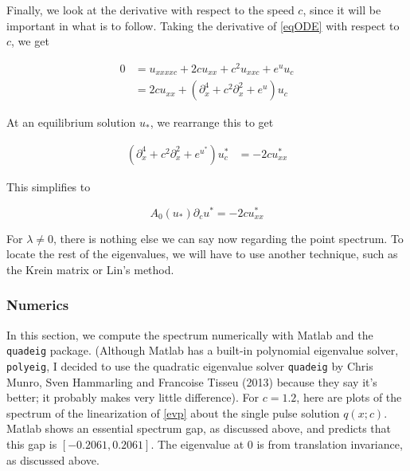 \documentclass[12pt]{article}
\begin{document}
Finally, we look at the derivative with respect to the speed $c$, since it will be important in what is to follow. Taking the derivative of \eqref{eqODE} with respect to $c$, we get

\begin{align*}
0 &= u_{xxxxc} + 2 c u_{xx} + c^2 u_{xxc} + e^{u} u_c \\
&= 2 c u_{xx} + (\partial_x^4 + c^2 \partial_x^2 + e^{u})u_c
\end{align*}

At an equilibrium solution $u_*$, we rearrange this to get

\begin{align*}
(\partial_x^4 + c^2 \partial_x^2 + e^{u^*})u^*_c &= -2 c u^*_{xx}
\end{align*}

This simplifies to 

\begin{equation}\label{uc}
A_0(u_*) \partial_c u^* = -2 c u^*_{xx}
\end{equation}

For $\lambda \neq 0$, there is nothing else we can say now regarding the point spectrum. To locate the rest of the eigenvalues, we will have to use another technique, such as the Krein matrix or Lin's method.

\subsubsection{Numerics}

In this section, we compute the spectrum numerically with Matlab and the \texttt{quadeig} package. (Although Matlab has a built-in polynomial eigenvalue solver, \texttt{polyeig}, I decided to use the quadratic eigenvalue solver \texttt{quadeig} by Chris Munro, Sven Hammarling and Francoise Tisseu (2013) because they say it's better; it probably makes very little difference). For $c = 1.2$, here are plots of the spectrum of the linearization of \eqref{evp} about the single pulse solution $q(x; c)$. Matlab shows an essential spectrum gap, as discussed above, and predicts that this gap is $[-0.2061, 0.2061]$. The eigenvalue at 0 is from translation invariance, as discussed above.
\end{document}
